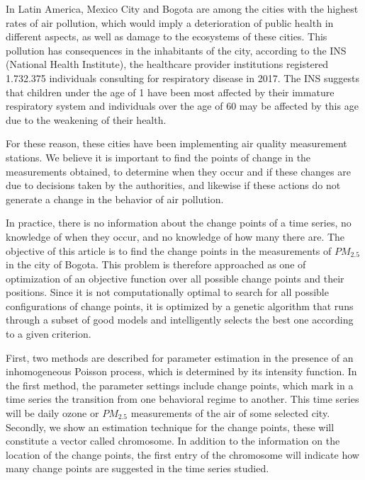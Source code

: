 \documentclass[APA,STIX1COL]{WileyNJD-v2}
\begin{document}
In Latin America, Mexico City and Bogota are among the cities with the highest rates of air pollution, which would imply a deterioration of public health in different aspects, as well as damage to the ecosystems of these cities.
This pollution has  consequences in the inhabitants of the city,  according to the INS (National Health Institute), the healthcare provider institutions registered 1.732.375 individuals consulting for respiratory disease in  2017. \cite{INS} The INS suggests that children under the age of 1 have been most affected by their immature respiratory system and individuals over the age of 60 may be affected by this age due to the weakening of their health.  

For these reason, these cities have been implementing air quality measurement stations. We believe it is important to find the points of change in the measurements obtained, to determine when they occur and if these changes are due to decisions taken by the authorities, and likewise if these actions do not generate a change in the behavior of air pollution. 

In practice, there is no information about the change points of a time series, no knowledge of when they occur, and no knowledge of how many there are. The objective of this article is to find the change points in the measurements of $PM_{2.5}$ in the city of Bogota. This problem is therefore approached as one of optimization of an objective function over all possible change points and their positions. Since it is not computationally optimal to search for all possible configurations of change points, it is optimized by a genetic algorithm that runs through a subset of good models and intelligently selects the best one according to a given criterion.



First, two methods are described for parameter estimation in the presence of an inhomogeneous Poisson process, which is determined by its intensity function. In the first method, the parameter settings include change points, which mark in a time series the transition from one behavioral regime to another. This time series will be daily ozone or $PM_{2.5}$ measurements of the air of some selected city. Secondly, we show an estimation technique for the change points, these will constitute a vector called chromosome. In addition to the information on the location of the change points, the first entry of the chromosome will indicate how many change points are suggested in the time series studied. 
\end{document}
